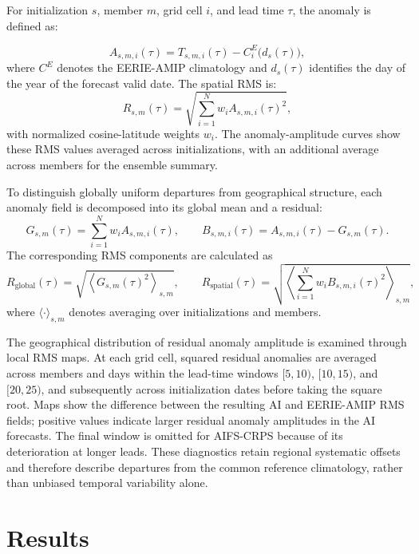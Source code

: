 For initialization $s$, member $m$, grid cell $i$, and lead time $\tau$, the anomaly is defined as:

\begin{equation}
    A_{s,m,i}(\tau) = T_{s,m,i}(\tau) - C^{E}_{i}\bigl(d_s(\tau)\bigr),
\end{equation}
where $C^{E}$ denotes the EERIE-AMIP climatology and $d_s(\tau)$ identifies the day of the year of the forecast valid date. The spatial RMS is:
\begin{equation}
    R_{s,m}(\tau) = \sqrt{\sum_{i=1}^{N} w_i A_{s,m,i}(\tau)^2},
    \label{eq:anomaly-rms}
\end{equation}
with normalized cosine-latitude weights $w_i$. The anomaly-amplitude curves show these RMS values averaged across initializations, with an additional average across members for the ensemble summary.

To distinguish globally uniform departures from geographical structure, each anomaly field is decomposed into its global mean and a residual:
\begin{equation}
    G_{s,m}(\tau) = \sum_{i=1}^{N} w_i A_{s,m,i}(\tau),
    \qquad 
    B_{s,m,i}(\tau) = A_{s,m,i}(\tau)-G_{s,m}(\tau).
\end{equation}
The corresponding RMS components are calculated as
\begin{equation}
    R_{\mathrm{global}}(\tau) = \sqrt{\left\langle G_{s,m}(\tau)^2\right\rangle_{s,m}},
    \qquad
    R_{\mathrm{spatial}}(\tau) =
    \sqrt{ \left\langle \sum_{i=1}^{N} w_i B_{s,m,i}(\tau)^2 \right\rangle_{s,m}},
\end{equation}
where $\langle\cdot\rangle_{s,m}$ denotes averaging over
initializations and members. 

The geographical distribution of residual anomaly amplitude is examined through local RMS maps. At each grid cell, squared residual anomalies are averaged across members and days within the lead-time windows $[5,10)$, $[10,15)$, and $[20,25)$, and subsequently across initialization dates before taking the square root. Maps show the difference between the resulting AI and EERIE-AMIP RMS fields; positive values indicate larger residual anomaly amplitudes in the AI forecasts. The final window is omitted for AIFS-CRPS because of its deterioration at longer leads. These diagnostics retain regional systematic offsets and therefore describe departures from the common reference climatology, rather than unbiased temporal variability alone.

\section{Results}


